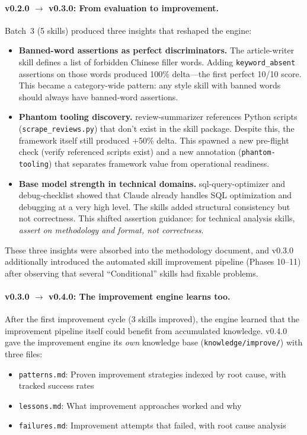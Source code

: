 \documentclass[11pt,a4paper]{article}
\begin{document}
\paragraph{v0.2.0 $\rightarrow$ v0.3.0: From evaluation to improvement.}
Batch~3 (5 skills) produced three insights that reshaped the engine:

\begin{itemize}[leftmargin=*]
    \item \textbf{Banned-word assertions as perfect discriminators.} The article-writer skill defines a list of forbidden Chinese filler words. Adding \texttt{keyword\_absent} assertions on those words produced 100\% delta---the first perfect 10/10 score. This became a category-wide pattern: any style skill with banned words should always have banned-word assertions.
    \item \textbf{Phantom tooling discovery.} review-summarizer references Python scripts (\texttt{scrape\_reviews.py}) that don't exist in the skill package. Despite this, the framework itself still produced +50\% delta. This spawned a new pre-flight check (verify referenced scripts exist) and a new annotation (\texttt{phantom-tooling}) that separates framework value from operational readiness.
    \item \textbf{Base model strength in technical domains.} sql-query-optimizer and debug-checklist showed that Claude already handles SQL optimization and debugging at a very high level. The skills added structural consistency but not correctness. This shifted assertion guidance: for technical analysis skills, \emph{assert on methodology and format, not correctness}.
\end{itemize}

These three insights were absorbed into the methodology document, and v0.3.0 additionally introduced the automated skill improvement pipeline (Phases 10--11) after observing that several ``Conditional'' skills had fixable problems.

\paragraph{v0.3.0 $\rightarrow$ v0.4.0: The improvement engine learns too.}
After the first improvement cycle (3 skills improved), the engine learned that the improvement pipeline itself could benefit from accumulated knowledge. v0.4.0 gave the improvement engine its \emph{own} knowledge base (\texttt{knowledge/improve/}) with three files:

\begin{itemize}[leftmargin=*]
    \item \texttt{patterns.md}: Proven improvement strategies indexed by root cause, with tracked success rates
    \item \texttt{lessons.md}: What improvement approaches worked and why
    \item \texttt{failures.md}: Improvement attempts that failed, with root cause analysis
\end{itemize}
\end{document}
